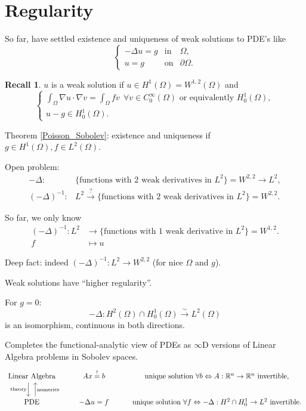 \documentclass[12pt]{article}
\theoremstyle{definition}
\newtheorem*{recall}{Recall}
\begin{document}
\section{Regularity}
So far, have settled existence and uniqueness of weak solutions to PDE's like
\[\left\{\begin{array}{rcl}-\Delta u=g&\text{in}&\Omega,\\u=g&\text{on}&\partial\Omega.\end{array}\right.\]
\begin{recall}
$u$ is a weak solution if $u\in H^1(\Omega)=W^{1,2}(\Omega)$ and
\[\left\{\begin{array}{l}\displaystyle{\int_\Omega\nabla u\cdot\nabla v=\int_\Omega fv\ \ \forall v\in C_0^\infty(\Omega)\text{ or equivalently }H_0^1(\Omega),}\\u-g\in H_0^1(\Omega).\end{array}\right.\]

Theorem \ref{Poisson_Sobolev}: existence and uniqueness if $g\in H^1(\Omega),f\in L^2(\Omega)$.
\end{recall}

Open problem:
\begin{align*}
-\Delta:&\{\text{functions with 2 weak derivatives in }L^2\}=W^{2,2}\longrightarrow L^2,\\
(-\Delta)^{-1}:&L^2\overset?\longrightarrow\{\text{functions with 2 weak derivatives in }L^2\}=W^{2,2}.
\end{align*}

So far, we only know
\begin{align*}
(-\Delta)^{-1}:L^2&\longrightarrow\{\text{functions with 1 weak derivative in }L^2\}=W^{1,2}.\\
f&\longmapsto u
\end{align*}

Deep fact: indeed $(-\Delta)^{-1}:L^2\rightarrow W^{2,2}$ (for nice $\Omega$ and $g$).

Weak solutions have ``higher regularity''.

For $g=0$:
\[-\Delta:H^2(\Omega)\cap H_0^1(\Omega)\overset\sim\longrightarrow L^2(\Omega)\]
is an isomorphism, continuous in both directions.

Completes the functional-analytic view of PDEs as $\infty$D versions of Linear Algebra problems in Sobolev spaces.
\[\begin{tikzcd}\text{Linear Algebra}\arrow[d,shift right,shift right,"\text{theory}",swap]&Ax\overset!=b&\text{unique solution }\forall b\Leftrightarrow A:\mathbb R^n\rightarrow\mathbb R^n\text{ invertible},\\\text{PDE}\arrow[u,shift right, shift right,"\text{numerics}",swap]&-\Delta u=f&\text{unique solution }\forall f\Leftrightarrow-\Delta:H^2\cap H_0^1\rightarrow L^2\text{ invertible}.\end{tikzcd}\]
\end{document}
